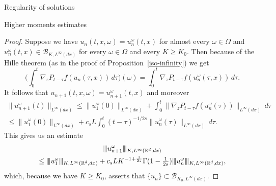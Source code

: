 \documentclass[a4paper,10pt,fleqn]{amsart}
\theoremstyle{remark}
\theoremstyle{definition}
\newcommand{\grad} {\nabla_{\!z}}
\newcommand{\X} {{\mathbb{R}^d}}
\renewcommand{\=} {\overset{d}{=}}
\newcommand{\viii} {|\kern-0.25ex|\kern-0.25ex|}
\newcommand{\K}[2] {\viii #1 \viii_{K,#2}}
\begin{document}
\begin{section}{Regularity of solutions}
\begin{subsection}{Higher moments estimates}
\begin{proof}
    Suppose we have $u_n(t,x,\omega) = u_n^\omega(t,x)$ for almost every $\omega\in\Omega$ and $u_n^\omega(t,x)\in \mathcal{B}_{K,L^\infty(dx)}$ for every $\omega\in\Omega$
    and every $K\geq K_0$.
    Then because of the Hille theorem (as in the proof of Proposition~\ref{iso-infinity}) we get
    \begin{equation*}
    \Big(\int_0^t \grad P_{t-\tau}f(u_n(\tau,x))\,d\tau\Big) (\omega)
    = \int_0^t \grad P_{t-\tau}f(u_n^\omega(\tau,x))\,d\tau.
    \end{equation*}
    It follows that $u_{n+1}(t,x,\omega) = u_{n+1}^\omega(t,x)$ and moreover
    \begin{multline*}
     \|u_{n+1}^\omega(t)\|_{L^\infty(dx)}
     \leq \|u^\omega_1(0)\|_{L^\infty(dx)} 
     + \int_0^t \|\grad P_{t-\tau}f(u_n^\omega(\tau))\|_{L^\infty(dx)}\,d\tau
     \\\leq \|u^\omega_1(0)\|_{L^\infty(dx)} 
     + c_sL\int_0^{t} (t-\tau)^{-1/2s}\|u_n^\omega(\tau)\|_{L^\infty(dx)}\,d\tau.
    \end{multline*}
    This gives us an estimate
    \begin{multline*}
     \K{u_{n+1}^\omega}{L^\infty(\X,dx)}\\\leq 
     \K{u_{1}^\omega}{L^\infty(\X,dx)} +
     c_sLK^{-1+\frac{1}{2s}}\Gamma(1-\tfrac{1}{2s})\K{u_{n}^\omega}{L^\infty(\X,dx)},
    \end{multline*}
    which, because we have $K\geq K_0$, asserts that $\{u_{n}\}\subset\mathcal{B}_{K_0,L^\infty(dx)}$.
    

\end{proof}
\end{subsection}
\end{section}
\end{document}
